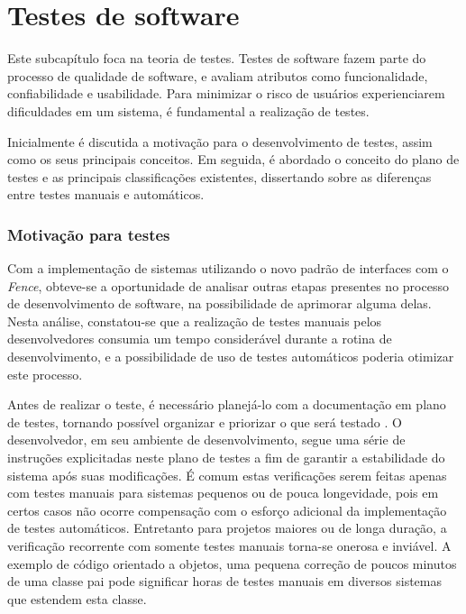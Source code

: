 \hypertarget{testes-de-software}{%
\section{Testes de software}\label{testes-de-software}}
Este subcapítulo foca na teoria de testes. Testes de software fazem parte do processo de qualidade de software, e avaliam atributos como funcionalidade, confiabilidade e usabilidade. Para minimizar o risco de usuários experienciarem dificuldades em um sistema, é fundamental a realização de testes.

Inicialmente é discutida a motivação para o desenvolvimento de testes, assim como os seus principais conceitos. Em seguida, é abordado o conceito do plano de testes e as principais classificações existentes, dissertando sobre as diferenças entre testes manuais e automáticos.

\hypertarget{motivacao-para-testes}{%
\subsubsection{Motivação para testes}\label{motivacao-para-testes}}

Com a implementação de sistemas utilizando o novo padrão de interfaces com o \emph{Fence}, obteve-se a oportunidade de analisar outras etapas presentes no processo de desenvolvimento de software, na possibilidade de aprimorar alguma delas. Nesta análise, constatou-se que a realização de testes manuais pelos desenvolvedores consumia um tempo considerável durante a rotina de desenvolvimento, e a possibilidade de uso de testes automáticos poderia otimizar este processo.

Antes de realizar o teste, é necessário planejá-lo com a documentação em plano de testes, tornando possível organizar e priorizar o que será testado \cite{leung}. O desenvolvedor, em seu ambiente de desenvolvimento, segue uma série de instruções explicitadas neste plano de testes a fim de garantir a estabilidade do sistema após suas modificações. É comum estas verificações serem feitas apenas com testes manuais para sistemas pequenos ou de pouca longevidade, pois em certos casos não ocorre compensação com o esforço adicional da implementação de testes automáticos. Entretanto para projetos maiores ou de longa duração, a verificação recorrente com somente testes manuais torna-se onerosa e inviável. A exemplo de código orientado a objetos, uma pequena correção de poucos minutos de uma classe pai pode significar horas de testes manuais em diversos sistemas que estendem esta classe.

